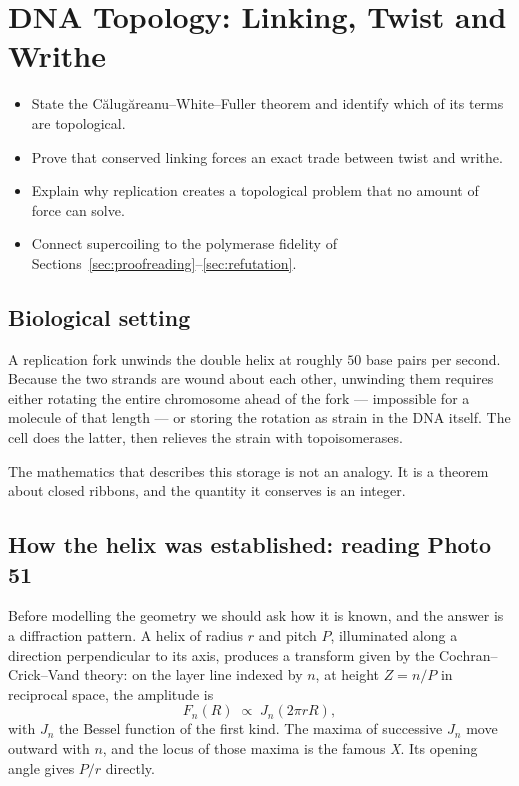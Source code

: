 \section{DNA Topology: Linking, Twist and Writhe}\label{sec:dnatop}

\begin{objectives}
\begin{itemize}[leftmargin=*,itemsep=1pt,topsep=1pt]
  \item State the Călugăreanu--White--Fuller theorem and identify which of its terms are topological.
  \item Prove that conserved linking forces an exact trade between twist and writhe.
  \item Explain why replication creates a topological problem that no amount of force can solve.
  \item Connect supercoiling to the polymerase fidelity of Sections~\ref{sec:proofreading}--\ref{sec:refutation}.
\end{itemize}
\end{objectives}

\subsection{Biological setting}

A replication fork unwinds the double helix at roughly $50$ base pairs per
second. Because the two strands are wound about each other, unwinding them
requires either rotating the entire chromosome ahead of the fork --- impossible
for a molecule of that length --- or storing the rotation as strain in the DNA
itself. The cell does the latter, then relieves the strain with topoisomerases.

The mathematics that describes this storage is not an analogy. It is a theorem
about closed ribbons, and the quantity it conserves is an integer.

\subsection{How the helix was established: reading Photo 51}\label{sub:photo51}

Before modelling the geometry we should ask how it is known, and the answer is a
diffraction pattern. A helix of radius $r$ and pitch $P$, illuminated along a
direction perpendicular to its axis, produces a transform given by the
Cochran--Crick--Vand theory: on the layer line indexed by $n$, at height
$Z = n/P$ in reciprocal space, the amplitude is
\begin{equation}\label{eq:ccv}
  F_n(R) \;\propto\; J_n\!\left(2\pi r R\right),
\end{equation}
with $J_n$ the Bessel function of the first kind. The maxima of successive $J_n$
move outward with $n$, and the locus of those maxima is the famous \emph{X}. Its
opening angle gives $P/r$ directly.

